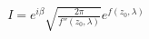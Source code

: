 \documentclass[preview]{standalone}
\begin{document}
\begin{align*}
I=e^{i\beta}\sqrt{\frac{2\pi}{f''(z_0,\lambda)}} e^{f(z_0,\lambda)}
\end{align*}
\end{document}
